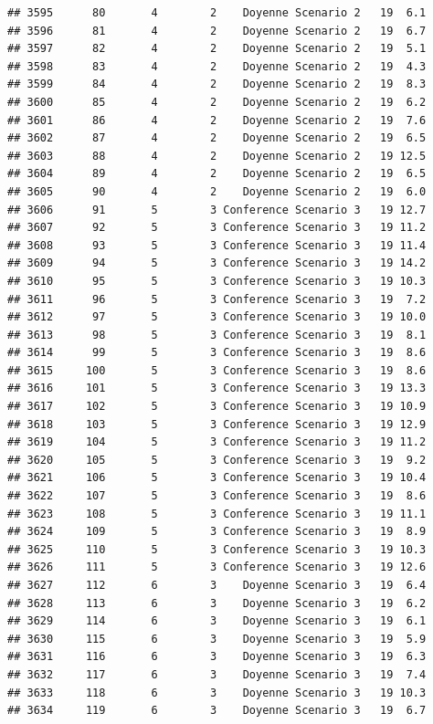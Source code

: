 \documentclass[
]{article}
\begin{document}
\begin{verbatim}
## 3595      80       4        2    Doyenne Scenario 2   19  6.1
## 3596      81       4        2    Doyenne Scenario 2   19  6.7
## 3597      82       4        2    Doyenne Scenario 2   19  5.1
## 3598      83       4        2    Doyenne Scenario 2   19  4.3
## 3599      84       4        2    Doyenne Scenario 2   19  8.3
## 3600      85       4        2    Doyenne Scenario 2   19  6.2
## 3601      86       4        2    Doyenne Scenario 2   19  7.6
## 3602      87       4        2    Doyenne Scenario 2   19  6.5
## 3603      88       4        2    Doyenne Scenario 2   19 12.5
## 3604      89       4        2    Doyenne Scenario 2   19  6.5
## 3605      90       4        2    Doyenne Scenario 2   19  6.0
## 3606      91       5        3 Conference Scenario 3   19 12.7
## 3607      92       5        3 Conference Scenario 3   19 11.2
## 3608      93       5        3 Conference Scenario 3   19 11.4
## 3609      94       5        3 Conference Scenario 3   19 14.2
## 3610      95       5        3 Conference Scenario 3   19 10.3
## 3611      96       5        3 Conference Scenario 3   19  7.2
## 3612      97       5        3 Conference Scenario 3   19 10.0
## 3613      98       5        3 Conference Scenario 3   19  8.1
## 3614      99       5        3 Conference Scenario 3   19  8.6
## 3615     100       5        3 Conference Scenario 3   19  8.6
## 3616     101       5        3 Conference Scenario 3   19 13.3
## 3617     102       5        3 Conference Scenario 3   19 10.9
## 3618     103       5        3 Conference Scenario 3   19 12.9
## 3619     104       5        3 Conference Scenario 3   19 11.2
## 3620     105       5        3 Conference Scenario 3   19  9.2
## 3621     106       5        3 Conference Scenario 3   19 10.4
## 3622     107       5        3 Conference Scenario 3   19  8.6
## 3623     108       5        3 Conference Scenario 3   19 11.1
## 3624     109       5        3 Conference Scenario 3   19  8.9
## 3625     110       5        3 Conference Scenario 3   19 10.3
## 3626     111       5        3 Conference Scenario 3   19 12.6
## 3627     112       6        3    Doyenne Scenario 3   19  6.4
## 3628     113       6        3    Doyenne Scenario 3   19  6.2
## 3629     114       6        3    Doyenne Scenario 3   19  6.1
## 3630     115       6        3    Doyenne Scenario 3   19  5.9
## 3631     116       6        3    Doyenne Scenario 3   19  6.3
## 3632     117       6        3    Doyenne Scenario 3   19  7.4
## 3633     118       6        3    Doyenne Scenario 3   19 10.3
## 3634     119       6        3    Doyenne Scenario 3   19  6.7

\end{verbatim}
\end{document}

